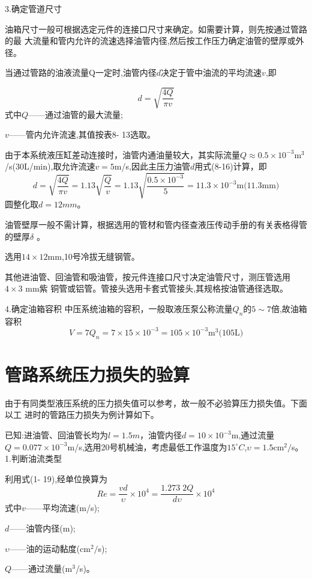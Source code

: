 3.确定管道尺寸

油箱尺寸一般可根据选定元件的连接口尺寸来确定。如需要计算，则先按通过管路的最
大流量和管内允许的流速选择油管内径,然后按工作压力确定油管的壁厚或外径。

当通过管路的油液流量Q一定时,油管内径$d$决定于管中油流的平均流速$v$,即

\begin{equation}
d=\sqrt{\frac{4Q}{\pi v}}
\end{equation}
式中\quad$Q$——通过油管的最大流量;

$v$——管内允许流速,其值按表8- 13选取。

由于本系统液压缸差动连接时，油管内通油量较大，其实际流量$Q\approx 0.5\times 10^{-3} \text{m}^{3}$/s(30L/min),取允许流速$v=5$m/s,因此主压力油管$d$用式(8-16)计算，即
$$
d=\sqrt{\frac{4Q}{\pi v}}=1.13\sqrt{\frac{Q}{v}}=1.13\sqrt{\frac{0.5\times 10^{-3}}{5}}=11.3\times 10^{-3}\text{m(11.3mm)}
$$
圆整化取$d=12mm$。

油管壁厚一般不需计算，根据选用的管材和管内径查液压传动手册的有关表格得管的壁厚$\delta$ 。

选用$14\times12$mm,10号冷拔无缝钢管。

其他进油管、回油管和吸油管，按元件连接口尺寸决定油管尺寸，测压管选用$4\times 3$ mm紫
铜管或铝管。管接头选用卡套式管接头,其规格按油管通径选取。

4.确定油箱容积
中压系统油箱的容积，一般取液压泵公称流量$Q_n$的$5\sim7$倍,故油箱容积
$$
V=7Q_n=7\times 15\times 10^{-3}=105\times 10^{-3}\text{m}^{3}\text{(105L)}
$$
\section{管路系统压力损失的验算}
由于有同类型液压系统的压力损失值可以参考，故一般不必验算压力损失值。下面以工
进时的管路压力损失为例计算如下。

已知:进油管、回油管长均为$l=1.5m$，油管内径$d=10\times 10^{-3}$m,通过流量$Q=0.077\times 10^{-3}$m/s,选用20号机械油，考虑最低工作温度为$15^{\circ}C$,$\upsilon=1.5 $cm$^2/$s。
1.判断油流类型

利用式(1- 19),经单位换算为
\begin{equation}
Re=\frac{vd}{\upsilon}\times 10^4=\frac{1.273\;2Q}{d\upsilon}\times 10^4
\end{equation}
式中\quad $v$——平均流速(m/s);

\quad$d$——油管内径(m);

\quad$\upsilon$——油的运动黏度(cm$^2/$s);

\quad$Q$——通过流量(m$^3$/s)。

